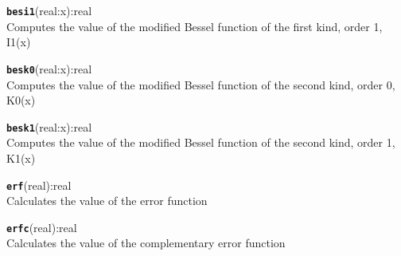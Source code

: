 \texttt{{\large\textbf{besi1}}}\textsf{(real:x):real}\\
 Computes the value of the modified Bessel function of the first kind, order 1, I1(x)

\hrulefill

\texttt{{\large\textbf{besk0}}}\textsf{(real:x):real}\\
 Computes the value of the modified Bessel function of the second kind, order 0, K0(x)

\hrulefill

\texttt{{\large\textbf{besk1}}}\textsf{(real:x):real}\\
 Computes the value of the modified Bessel function of the second kind, order 1, K1(x)

\hrulefill

\texttt{{\large\textbf{erf}}}\textsf{(real):real}\\
 Calculates the value of the error function

\hrulefill

\texttt{{\large\textbf{erfc}}}\textsf{(real):real}\\
 Calculates the value of the complementary error function
